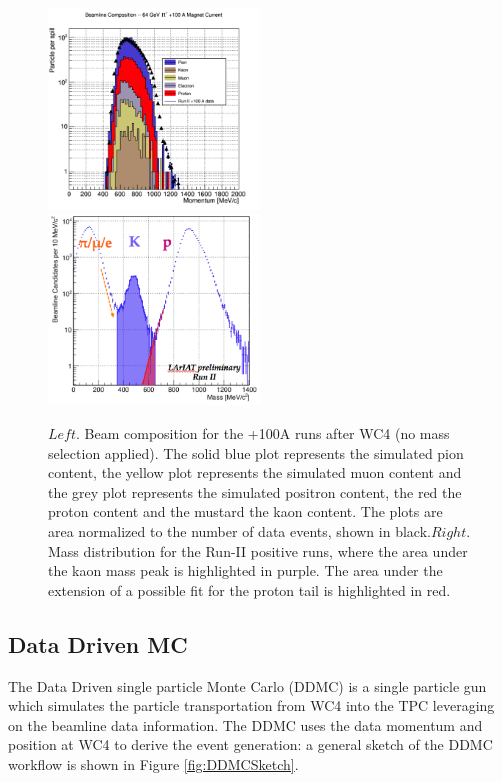 \begin{figure}
\includegraphics[width=0.5\textwidth,height=\textheight,keepaspectratio]{Chapter-5/Images/Beam100Pos.png}
\includegraphics[width=0.5\textwidth,height=\textheight,keepaspectratio]{Chapter-5/Images/MassPos.png}
\caption{$Left.$ Beam composition for the +100A runs after WC4 (no mass selection applied). The solid blue plot represents the simulated pion content, the yellow plot represents the simulated muon content and the grey plot represents the simulated positron content, the red the proton content and the mustard the kaon content. The plots are area normalized to the number of data events, shown in black.$Right.$ Mass distribution for the Run-II positive runs, where the area under the kaon mass peak is highlighted in purple. The area under the extension of a possible fit for the proton tail is highlighted in red. }
\label{fig:BeamCompositionPos}
\end{figure}



\subsection{Data Driven MC}\label{sec:DDMC}
The Data Driven single particle Monte Carlo (DDMC) is a single particle gun which simulates the particle transportation from WC4 into the TPC leveraging on the beamline data information. The DDMC uses the data momentum and position at WC4 to derive the event generation: a general sketch of the DDMC workflow is shown in Figure \ref{fig:DDMCSketch}.

